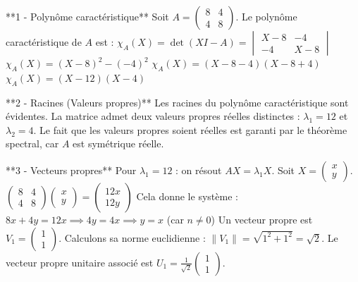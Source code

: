 \documentclass[11pt,a4paper]{article}
\begin{document}
**1 - Polynôme caractéristique**
Soit $A = \begin{pmatrix} 8 & 4 \\ 4 & 8 \end{pmatrix}$.
Le polynôme caractéristique de $A$ est :
$\chi_A(X) = \det(X I - A) = \begin{vmatrix} X - 8 & -4 \\ -4 & X - 8 \end{vmatrix}$
$\chi_A(X) = (X - 8)^2 - (-4)^2$
$\chi_A(X) = (X - 8 - 4)(X - 8 + 4)$
$\chi_A(X) = (X - 12)(X - 4)$

**2 - Racines (Valeurs propres)**
Les racines du polynôme caractéristique sont évidentes. La matrice admet deux valeurs propres réelles distinctes :
$\lambda_1 = 12$ et $\lambda_2 = 4$.
Le fait que les valeurs propres soient réelles est garanti par le théorème spectral, car $A$ est symétrique réelle.

**3 - Vecteurs propres**
Pour $\lambda_1 = 12$ : on résout $AX = \lambda_1 X$.
Soit $X = \begin{pmatrix} x \\ y \end{pmatrix}$.
$\begin{pmatrix} 8 & 4 \\ 4 & 8 \end{pmatrix} \begin{pmatrix} x \\ y \end{pmatrix} = \begin{pmatrix} 12x \\ 12y \end{pmatrix}$
Cela donne le système :
$8x + 4y = 12x \implies 4y = 4x \implies y = x$ (car $n \neq 0$)
Un vecteur propre est $V_1 = \begin{pmatrix} 1 \\ 1 \end{pmatrix}$.
Calculons sa norme euclidienne : $\|V_1\| = \sqrt{1^2 + 1^2} = \sqrt{2}$.
Le vecteur propre unitaire associé est $U_1 = \frac{1}{\sqrt{2}} \begin{pmatrix} 1 \\ 1 \end{pmatrix}$.
\end{document}
